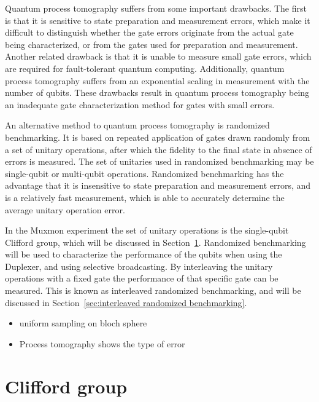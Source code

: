       Quantum process tomography suffers from some important drawbacks. The first is that it is sensitive to state preparation and measurement errors, which make it difficult to distinguish whether the gate errors originate from the actual gate being characterized, or from the gates used for preparation and measurement. Another related drawback is that it is unable to measure small gate errors, which are required for fault-tolerant quantum computing. Additionally, quantum process tomography suffers from an exponential scaling in measurement with the number of qubits. These drawbacks result in quantum process tomography being an inadequate gate characterization method for gates with small errors.

      An alternative method to quantum process tomography is randomized benchmarking. It is based on repeated application of gates drawn randomly from a set of unitary operations, after which the fidelity to the final state in absence of errors is measured. The set of unitaries used in randomized benchmarking may be single-qubit or multi-qubit operations. Randomized benchmarking has the advantage that it is insensitive to state preparation and measurement errors, and is a relatively fast measurement, which is able to accurately determine the average unitary operation error.

      In the Muxmon experiment the set of unitary operations is the single-qubit Clifford group, which will be discussed in Section~\ref{sec:Clifford group}. Randomized benchmarking will be used to characterize the performance of the qubits when using the Duplexer, and using selective broadcasting. By interleaving the unitary operations with a fixed gate the performance of that specific gate can be measured. This is known as interleaved randomized benchmarking, and will be discussed in Section~\ref{sec:interleaved randomized benchmarking}.

      \begin{itemize}
        \item uniform sampling on bloch sphere
        \item Process tomography shows the type of error
      \end{itemize}

    \section{Clifford group}
      \label{sec:Clifford group}

